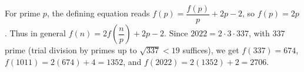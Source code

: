 For prime $p$, the defining equation reads $f(p)=\dfrac{f(p)}{p}+2p-2$, so $f(p)=2p$. Thus in general $f(n)=2f(\dfrac{n}{p})+2p-2$. Since $2022=2\cdot3\cdot337$, with $337$ prime (trial division by primes up to $\sqrt{337}<19$ suffices), we get $f(337)=674$, $f(1011)=2(674)+4=1352$, and $f(2022)=2(1352)+2=\boxed{2706}$.
